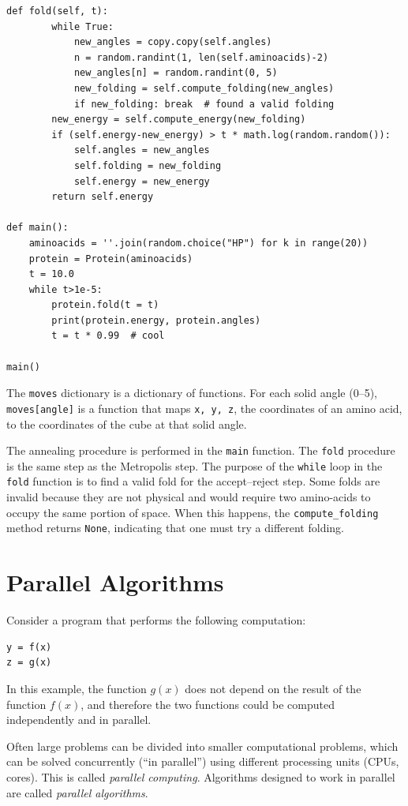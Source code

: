 \documentclass[justified, sixbynine]{tufte-book}
\def\ft{\small\tt}
\theoremstyle{plain}%
\newtheorem * {corollary}{Corollary}
\theoremstyle{definition}
\theoremstyle{remark}
\newtheorem * {remark}{Remark}
\newtheorem * {note}{Note}
\begin{document}
\begin{fullwidth}
\begin{lstlisting}[caption={in file: {\ft folding.py}}]
    def fold(self, t):
        while True:
            new_angles = copy.copy(self.angles)
            n = random.randint(1, len(self.aminoacids)-2)
            new_angles[n] = random.randint(0, 5)
            new_folding = self.compute_folding(new_angles)
            if new_folding: break  # found a valid folding
        new_energy = self.compute_energy(new_folding)
        if (self.energy-new_energy) > t * math.log(random.random()):
            self.angles = new_angles
            self.folding = new_folding
            self.energy = new_energy
        return self.energy

def main():
    aminoacids = ''.join(random.choice("HP") for k in range(20))
    protein = Protein(aminoacids)
    t = 10.0
    while t>1e-5:
        protein.fold(t = t)
        print(protein.energy, protein.angles)
        t = t * 0.99  # cool

main()
\end{lstlisting}

The {\ft moves} dictionary is a dictionary of functions. For each solid angle (0--5), {\ft moves[angle]} is a function that maps {\ft x, y, z}, the coordinates of an amino acid, to the coordinates of the cube at that solid angle.

The annealing procedure is performed in the {\ft main} function. The {\ft fold} procedure is the same step as the Metropolis step. The purpose of the {\ft while} loop in the {\ft fold} function is to find a valid fold for the accept--reject step. Some folds are invalid because they are not physical and would require two amino-acids to occupy the same portion of space. When this happens, the {\ft compute\_folding} method returns {\ft None}, indicating that one must try a different folding.

\chapter{Parallel Algorithms}

Consider a program that performs the following computation:
\begin{lstlisting}
y = f(x)
z = g(x)
\end{lstlisting}
In this example, the function $g(x)$ does not depend on the result of the function $f(x)$, and therefore the two functions could be computed independently and in parallel.

Often large problems can be divided into smaller computational problems, which can be solved concurrently (``in parallel'') using different processing units (CPUs, cores). This is called {\it parallel computing}. Algorithms designed to work in parallel are called {\it parallel algorithms}.


\end{fullwidth}
\end{document}
